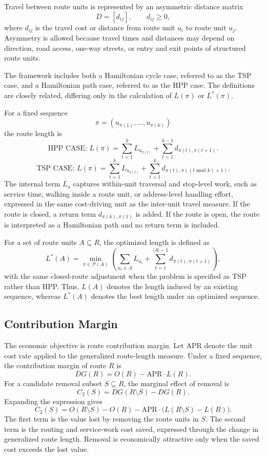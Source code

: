 \documentclass[preprint,12pt]{elsarticle}
\begin{document}
Travel between route units is represented by an asymmetric distance matrix
\[
D=[d_{ij}], \qquad d_{ij}\geq 0,
\]
where $d_{ij}$ is the travel cost or distance from route unit $u_i$ to route unit $u_j$. Asymmetry is allowed because travel times and distances may depend on direction, road access, one-way streets, or entry and exit points of structured route units.

The framework includes both a Hamiltonian cycle case, referred to as the TSP case, and a Hamiltonian path case, referred to as the HPP case. 
The definitions are closely related, differing only in the calculation of $L(\pi)$ or $L^*(\pi)$.

For a fixed sequence
\[
\pi=(u_{\pi(1)},\ldots,u_{\pi(k)})
\]
the route length is
\[
\text{HPP CASE: }L(\pi)=\sum_{t=1}^{k}L_{u_{\pi(t)}}+
\sum_{t=1}^{k-1}d_{\pi(t),\pi(t+1)}.
\]
\[
\text{TSP CASE: }L(\pi)=\sum_{t=1}^{k}L_{u_{\pi(t)}}+
\sum_{t=1}^{k}d_{\pi(t),\pi((t \text{ mod } k)+1)}.
\]
The internal term $L_u$ captures within-unit traversal and stop-level work, such as service time, walking inside a route unit, or address-level handling effort, expressed in the same cost-driving unit as the inter-unit travel measure. If the route is closed, a return term $d_{\pi(k),\pi(1)}$ is added. If the route is open, the route is interpreted as a Hamiltonian path and no return term is included.

For a set of route units $A\subseteq R$, the optimized length is defined as
\[
L^*(A)=
\min_{\pi\in\mathcal{P}(A)}
\left(
\sum_{u_i\in A}L_{u_i}
+\sum_{t=1}^{|A|-1}d_{\pi(t),\pi(t+1)}
\right),
\]
with the same closed-route adjustment when the problem is specified as TSP rather than HPP. Thus, $L(A)$ denotes the length induced by an existing sequence, whereas $L^*(A)$ denotes the best length under an optimized sequence.

\subsection{Contribution Margin}
\label{subsec:contribution-margin}

The economic objective is route contribution margin. Let $\mathrm{APR}$ denote the unit cost rate applied to the generalized route-length measure. Under a fixed sequence, the contribution margin of route $R$ is
\[
DG(R)=O(R)-\mathrm{APR}\cdot L(R).
\]
For a candidate removal subset $S\subseteq R$, the marginal effect of removal is
\[
C_2(S)=DG(R\setminus S)-DG(R).
\]
Expanding the expression gives
\[
C_2(S)
=O(R\setminus S)-O(R)
-\mathrm{APR}\cdot\bigl(L(R\setminus S)-L(R)\bigr).
\]
The first term is the value lost by removing the route units in $S$. The second term is the routing and service-work cost saved, expressed through the change in generalized route length. Removal is economically attractive only when the saved cost exceeds the lost value.
\end{document}
